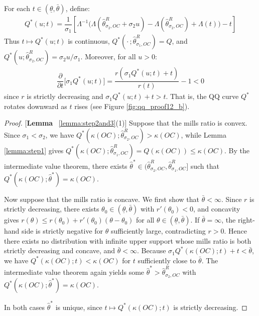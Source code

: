 \noindent For each $t\in(\underline{\theta},\bar{\theta})$, define:
\begin{align*}
    Q^*(u;t) =\dfrac{1}{\sigma_1}\left[\Lambda^{-1}\big(\Lambda(\hat{\theta}^R_{\sigma_2,OC}+\sigma_2u)-\Lambda(\hat{\theta}^R_{\sigma_2,OC})+\Lambda(t)\big) - t\right]
\end{align*}
Thus $t\mapsto Q^*(u;t)$ is continuous, $Q^*(\cdot\,;\hat{\theta}^R_{\sigma_1,OC})=Q$, and $Q^*(u;\hat{\theta}^R_{\sigma_2,OC})=\sigma_2u/\sigma_1$. Moreover, for all $u>0$:
\begin{align*}
    \dfrac{\partial}{\partial t}\big[\sigma_1Q^*(u;t)\big]=\dfrac{r(\sigma_1Q^*(u;t)+t)}{r(t)}-1<0
\end{align*}
since $r$ is strictly decreasing and $\sigma_1Q^*(u;t)+t>t$. That is, the QQ curve $Q^*$ rotates downward as $t$ rises (see Figure \ref{fig:qq_proof12_b}).

\begin{proof}{[\textbf{Lemma} ~\ref{lemma:step2and3}(1)]} Suppose that the mills ratio is convex. Since $\sigma_1<\sigma_2$, we have $Q^*(\kappa(OC);\hat{\theta}^R_{\sigma_2,OC})>\kappa(OC)$, while Lemma \ref{lemma:step1} gives $Q^*(\kappa(OC);\hat{\theta}^R_{\sigma_1,OC})=Q(\kappa(OC))\leq\kappa(OC)$. By the intermediate value theorem, there exists $\hat{\theta}^*\in(\hat{\theta}^R_{\sigma_2,OC},\hat{\theta}^R_{\sigma_1,OC}]$ such that $Q^*(\kappa(OC);\hat{\theta}^*)=\kappa(OC)$.

\noindent Now suppose that the mills ratio is concave. We first show that $\bar{\theta}<\infty$. Since $r$ is strictly decreasing, there exists $\theta_0\in(\underline{\theta},\bar{\theta})$ with $r'(\theta_0)<0$, and concavity gives $r(\theta)\leq r(\theta_0)+r'(\theta_0)(\theta-\theta_0)$ for all $\theta\in(\underline{\theta},\bar{\theta})$. If $\bar{\theta}=\infty$, the right-hand side is strictly negative for $\theta$ sufficiently large, contradicting $r>0$. Hence there exists no distribution with infinite upper support whose mills ratio is both strictly decreasing and concave, and $\bar{\theta}<\infty$. Because $\sigma_1Q^*(\kappa(OC);t)+t<\bar{\theta}$, we have $Q^*(\kappa(OC);t)<\kappa(OC)$ for $t$ sufficiently close to $\bar{\theta}$. The intermediate value theorem again yields some $\hat{\theta}^*>\hat{\theta}^R_{\sigma_2,OC}$ with $Q^*(\kappa(OC);\hat{\theta}^*)=\kappa(OC)$.

\noindent In both cases $\hat{\theta}^*$ is unique, since $t\mapsto Q^*(\kappa(OC);t)$ is strictly decreasing.
\end{proof}

